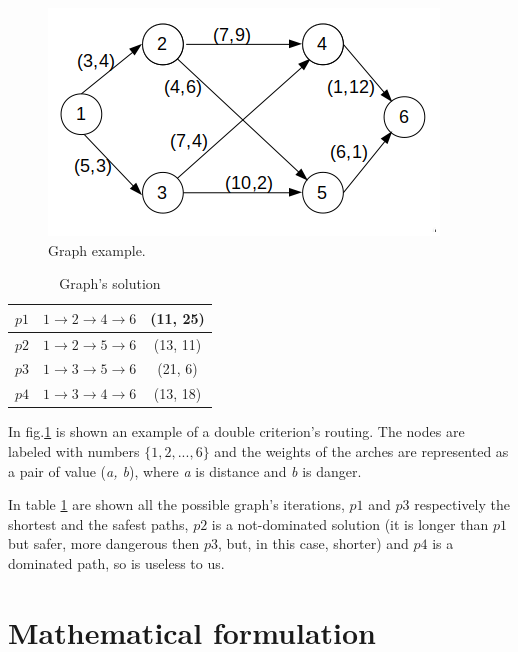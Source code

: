 \documentclass[a4paper,11pt]{report}
\begin{document}
\begin{figure}
	\centering
	\includegraphics[width=\linewidth]{img/exampleGraph1}
	\caption{Graph example.}
	\label{fig:graphExample}
\end{figure}

\begin{table}[]
	\centering
	\begin{tabular}{|c|c|c|}
		\hline
		$p1$ & $1\to2\to4\to6$ & (11, 25) \\ \hline
		$p2$ & $1\to2\to5\to6$ & (13, 11)  \\ \hline
		$p3$ & $1\to3\to5\to6$ & (21, 6)  \\ \hline
		$p4$ & $1\to3\to4\to6$ & (13, 18)  \\ \hline
	\end{tabular}
	\caption{Graph's solution}
	\label{tab:graphExample}
\end{table}

In fig.\ref{fig:graphExample} is shown an example of a double criterion's routing. The nodes are labeled with numbers $\{1,2, ..., 6\}$ and the weights of the arches are represented as a pair of value (\textit{a, b}), where \textit{a} is distance and \textit{b} is danger.

In table \ref{tab:graphExample} are shown all the possible graph's iterations, $p1$ and $p3$ respectively the shortest and the safest paths, $p2$ is a not-dominated solution (it is longer than $p1$ but safer, more dangerous then $p3$, but, in this case, shorter) and $p4$ is a dominated path, so is useless to us.


 
\section{Mathematical formulation}
\end{document}
